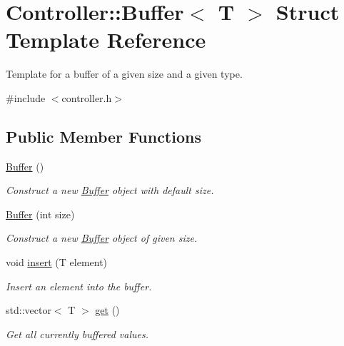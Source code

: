 \hypertarget{structController_1_1Buffer}{}\section{Controller\+:\+:Buffer$<$ T $>$ Struct Template Reference}
\label{structController_1_1Buffer}


Template for a buffer of a given size and a given type.  




{\ttfamily \#include $<$controller.\+h$>$}

\subsection*{Public Member Functions}
\begin{DoxyCompactItemize}
\item 
\hyperlink{structController_1_1Buffer_af9a6e1eefa379cbbaac009f7ee3e6912}{Buffer} ()\hypertarget{structController_1_1Buffer_af9a6e1eefa379cbbaac009f7ee3e6912}{}\label{structController_1_1Buffer_af9a6e1eefa379cbbaac009f7ee3e6912}

\begin{DoxyCompactList}\small\item\em Construct a new \hyperlink{structController_1_1Buffer}{Buffer} object with default size. \end{DoxyCompactList}\item 
\hyperlink{structController_1_1Buffer_a05279a3252b1896a35459387458abd4b}{Buffer} (int size)
\begin{DoxyCompactList}\small\item\em Construct a new \hyperlink{structController_1_1Buffer}{Buffer} object of given size. \end{DoxyCompactList}\item 
void \hyperlink{structController_1_1Buffer_aeb29555b9b1be00916e2a631128f103c}{insert} (T element)
\begin{DoxyCompactList}\small\item\em Insert an element into the buffer. \end{DoxyCompactList}\item 
std\+::vector$<$ T $>$ \hyperlink{structController_1_1Buffer_a6b5ebe18f4fff2824f3797c8afa3aced}{get} ()
\begin{DoxyCompactList}\small\item\em Get all currently buffered values. \end{DoxyCompactList}\end{DoxyCompactItemize}
